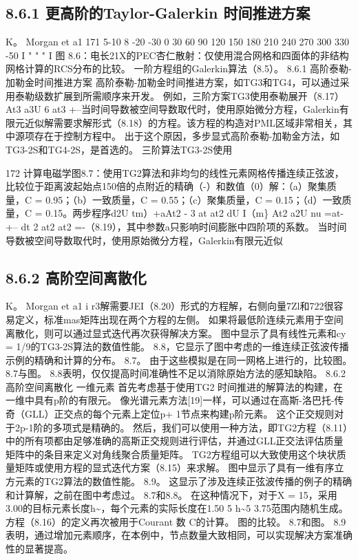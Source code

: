 \documentclass[UTF8,11pt,a4paper,openany,fontset=fandol]{ctexbook}
\begin{document}
\subsection{8.6.1 更高阶的Taylor-Galerkin 时间推进方案}
K。 Morgan et a1 171 5-10 8 -20 -30 0 30 60 90 120 150 180 210 240 270 300 330 -50 I " " " I 图 8.6：电长21X的PEC杏仁散射：仅使用混合网格和四面体的非结构网格计算的RCS分布的比较。 一阶方程组的Galerkin算法（8.5）。 8.6.1 高阶泰勒-加勒金时间推进方案 高阶泰勒-加勒金时间推进方案，如TG3和TG4，可以通过采用泰勒级数扩展到所需顺序来开发。 例如，三阶方案TG3使用泰勒展开（8.17）At3 a3U 6 at3 +--当时间导数被空间导数取代时，使用原始微分方程，Galerkin有限元近似解需要求解形式（8.18）的方程。该方程的构造对PML区域非常相关，其中源项存在于控制方程中。 出于这个原因，多步显式高阶泰勒-加勒金方法，如TG3-2S和TG4-2S，是首选的。 三阶算法TG3-2S使用

172 计算电磁学图8.7：使用TG2算法和非均匀的线性元素网格传播连续正弦波，比较位于距离波起始点150倍的点附近的精确（-）和数值（0）解：（a）聚集质量，C = 0.95；（b）一致质量，C = 0.55；（c）聚集质量，C = 0.15；（d）一致质量，C = 0.15。两步程序d2U tm）+aAt2 - 3 at at2 dU I（m\} At2 a2U nu =at- +-- dt 2 at2 at2 =-（8.19），其中参数a只影响时间膨胀中四阶项的系数。 当时间导数被空间导数取代时，使用原始微分方程，Galerkin有限元近似

\subsection{8.6.2 高阶空间离散化}
K。 Morgan et a1 i r3解需要JEI（8.20）形式的方程解，右侧向量7Zl和722很容易定义，标准mas矩阵出现在两个方程的左侧。 如果将最低阶连续元素用于空间离散化，则可以通过显式迭代再次获得解决方案。 图中显示了具有线性元素和cy = 1/9的TG3-2S算法的数值性能。 8.8，它显示了图中考虑的一维连续正弦波传播示例的精确和计算的分布。 8.7。 由于这些模拟是在同一网格上进行的，比较图。 8.7与图。 8.8表明，仅仅提高时间准确性不足以消除原始方法的感知缺陷。 8.6.2 高阶空间离散化 一维元素 首先考虑基于使用TG2 时间推进的解算法的构建，在一维中具有p阶的有限元。 像光谱元素方法[19]一样，可以通过在高斯-洛巴托-传奇（GLL）正交点的每个元素上定位p+ 1节点来构建p阶元素。 这个正交规则对于2p-1阶的多项式是精确的。 然后，我们可以使用一种方法，即TG2方程（8.11）中的所有项都由足够准确的高斯正交规则进行评估，并通过GLL正交法评估质量矩阵中的条目来定义对角线聚合质量矩阵。 TG2方程组可以大致使用这个块状质量矩阵或使用方程的显式迭代方案（8.15）来求解。 图中显示了具有一维有序立方元素的TG2算法的数值性能。 8.9。 这显示了涉及连续正弦波传播的例子的精确和计算解，之前在图中考虑过。 8.7和8.8。 在这种情况下，对于X = 15，采用3.00的目标元素长度h\textasciitilde{}，每个元素的实际长度在1.50 5 h\textasciitilde{}5 3.75范围内随机生成。 方程（8.16）的定义再次被用于Courant 数 C的计算。 图的比较。 8.7和图。 8.9表明，通过增加元素顺序，在本例中，节点数量大致相同，可以实现解决方案准确性的显著提高。
\end{document}
